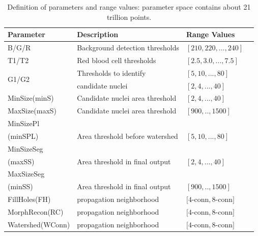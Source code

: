 \begin{table}[t!]
\begin{center}
\begin{scriptsize}
\begin{tabular}{l l l l }
\hline
Parameter   & Description & Range Values      \\ \hline
B/G/R & Background detection thresholds &  $[210,220,...,240]$  \\ \hline
T1/T2  & Red blood cell thresholds & $[2.5,3.0,...,7.5]$   \\ \hline
\multirow{2}{*}{G1/G2}  & Thresholds to identify  & $[5,10,...,80]$   \\ 
   & candidate nuclei & $[2,4,...,40]$    \\ \hline
MinSize(minS)   & Candidate nuclei area threshold   & $[2,4,...,40]$    \\ \hline
MaxSize(maxS)   & Candidate nuclei area threshold & $[900,..,1500]$   \\ \hline 
MinSizePl \\ (minSPL) & Area threshold before watershed & $[5,10,...,80]$   \\ \hline
MinSizeSeg \\ (maxSS) & Area threshold in final output   & $[2,4,...,40]$    \\ \hline 
MaxSizeSeg \\ (minSS) & Area threshold in final output  & $[900,..,1500]$   \\ \hline 
FillHoles(FH)  & propagation neighborhood  & $[4$-conn$,8$-conn$]$   \\ \hline
MorphRecon(RC) & propagation neighborhood  & $[4$-conn$,8$-conn$]$   \\ \hline
Watershed(WConn)  & propagation neighborhood  & $[4$-conn$,8$-conn$]$   \\ \hline
\end{tabular}
\end{scriptsize}
\caption{Definition of parameters and range values: parameter space contains about 21 trillion points.\label{tab:parameters}}
\end{center}
\vspace{-4mm}
\end{table}

